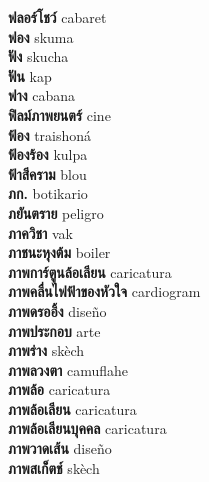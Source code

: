 \textbf{ ฟลอร์โชว์  } cabaret \\
\textbf{ ฟอง  } skuma \\
\textbf{ ฟัง  } skucha \\
\textbf{ ฟัน  } kap \\
\textbf{ ฟาง  } cabana \\
\textbf{ ฟิลม์ภาพยนตร์  } cine \\
\textbf{ ฟ้อง  } traishoná \\
\textbf{ ฟ้องร้อง  } kulpa \\
\textbf{ ฟ้าสีคราม  } blou \\
\textbf{ ภก.  } botikario \\
\textbf{ ภยันตราย  } peligro \\
\textbf{ ภาควิชา  } vak \\
\textbf{ ภาชนะหุงต้ม  } boiler \\
\textbf{ ภาพการ์ตูนล้อเลียน  } caricatura \\
\textbf{ ภาพคลื่นไฟฟ้าของหัวใจ  } cardiogram \\
\textbf{ ภาพดรออิ้ง  } diseño \\
\textbf{ ภาพประกอบ  } arte \\
\textbf{ ภาพร่าง  } skèch \\
\textbf{ ภาพลวงตา  } camuflahe \\
\textbf{ ภาพล้อ  } caricatura \\
\textbf{ ภาพล้อเลียน  } caricatura \\
\textbf{ ภาพล้อเลียนบุคคล  } caricatura \\
\textbf{ ภาพวาดเส้น  } diseño \\
\textbf{ ภาพสเก็ตช์  } skèch \\
